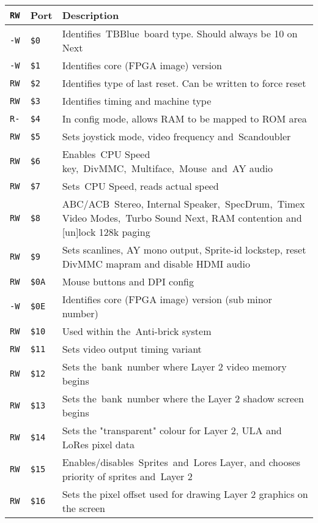 \documentclass[twoside,openright,a4paper]{book}
\newcommand{\notet}{\rule{0pt}{2.4ex}}
\begin{document}
\newcommand{\nexttitle}{\tt {RW} & Port & Description \\ \hline}
\newcommand{\nextport}[3]{\tt {#1}\notet & {\tt \$#2} & #3}

\begin{tabular}{llp{12.1cm}}
	\nexttitle

	\nextport{-W}{0}{Identifies TBBlue board type. Should always be 10 on Next} \\
	\nextport{-W}{1}{Identifies core (FPGA image) version} \\
	\nextport{RW}{2}{Identifies type of last reset. Can be written to force reset} \\
	\nextport{RW}{3}{Identifies timing and machine type} \\
	\nextport{R-}{4}{In config mode, allows RAM to be mapped to ROM area} \\
	\nextport{RW}{5}{Sets joystick mode, video frequency and Scandoubler} \\
	\nextport{RW}{6}{Enables CPU Speed key, DivMMC, Multiface, Mouse and AY audio} \\
	\nextport{RW}{7}{Sets CPU Speed, reads actual speed} \\
	\nextport{RW}{8}{ABC/ACB Stereo, Internal Speaker, SpecDrum, Timex Video Modes, Turbo Sound Next, RAM contention and [un]lock 128k paging} \\
	\nextport{RW}{9}{Sets scanlines, AY mono output, Sprite-id lockstep, reset DivMMC mapram and disable HDMI audio} \\
	\nextport{RW}{0A}{Mouse buttons and DPI config} \\
	\nextport{-W}{0E}{Identifies core (FPGA image) version (sub minor number)} \\
	\nextport{RW}{10}{Used within the Anti-brick system} \\
	\nextport{RW}{11}{Sets video output timing variant} \\
	\nextport{RW}{12}{Sets the bank number where Layer 2 video memory begins} \\
	\nextport{RW}{13}{Sets the bank number where the Layer 2 shadow screen begins} \\
	\nextport{RW}{14}{Sets the "transparent" colour for Layer 2, ULA and LoRes pixel data} \\
	\nextport{RW}{15}{Enables/disables Sprites and Lores Layer, and chooses priority of sprites and Layer 2} \\
	\nextport{RW}{16}{Sets the pixel offset used for drawing Layer 2 graphics on the screen} \\

\end{tabular}
\end{document}
